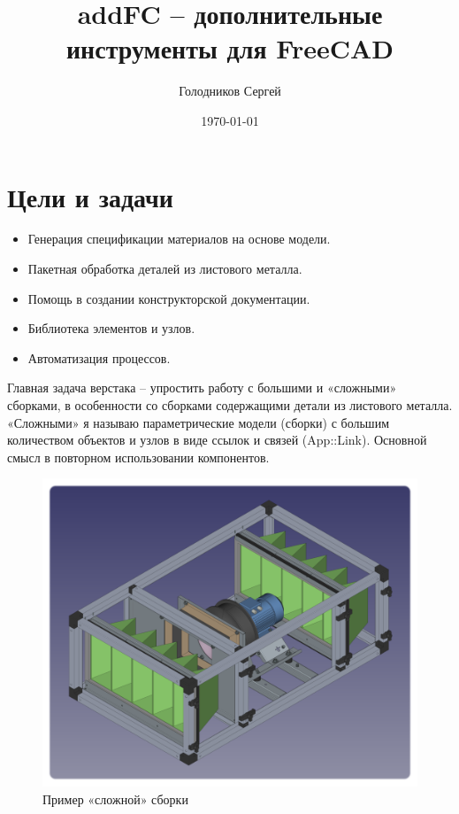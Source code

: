 \documentclass[a4paper,12pt]{article}
\title{addFC -- дополнительные инструменты для FreeCAD}
\author{Голодников Сергей}
\date{\today}
\begin{document}
\maketitle




\section{Цели и задачи}

\begin{itemize}
	\item Генерация спецификации материалов на основе модели.
	\item Пакетная обработка деталей из листового металла.
	\item Помощь в создании конструкторской документации.
	\item Библиотека элементов и узлов.
	\item Автоматизация процессов.\\
\end{itemize}

Главная задача верстака -- упростить работу с большими и «сложными» сборками, в особенности со сборками содержащими детали из листового металла. «Сложными» я называю параметрические модели (сборки) с большим количеством объектов и узлов в виде ссылок и связей (App::Link). Основной смысл в повторном использовании компонентов.

\begin{figure}[htp]
	\centering
	\includegraphics[scale=0.46]{img/assembly_example.png}
	\caption{Пример «сложной» сборки}
	\label{sec:assembly_example}
\end{figure}
\end{document}
